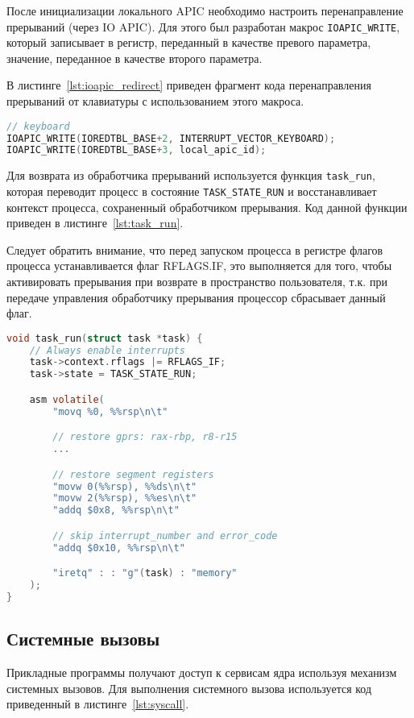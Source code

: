 После инициализации локального APIC необходимо настроить перенаправление прерываний (через IO APIC).
Для этого был разработан макрос \texttt{IOAPIC\_WRITE}, который записывает в регистр, переданный
в качестве превого параметра, значение, переданное в качестве второго параметра.

В листинге~\ref{lst:ioapic_redirect} приведен фрагмент кода перенаправления прерываний от клавиатуры
с использованием этого макроса.

\begin{lstlisting}[language=C,
caption={Настройка IOAPIC},
label={lst:ioapic_redirect}]
// keyboard
IOAPIC_WRITE(IOREDTBL_BASE+2, INTERRUPT_VECTOR_KEYBOARD);
IOAPIC_WRITE(IOREDTBL_BASE+3, local_apic_id);
\end{lstlisting}

Для возврата из обработчика прерываний используется функция \texttt{task\_run},
которая переводит процесс в состояние \texttt{TASK\_STATE\_RUN} и восстанавливает
контекст процесса, сохраненный обработчиком прерывания. Код данной функции
приведен в листинге~\ref{lst:task_run}.

Следует обратить внимание, что перед запуском процесса в регистре флагов процесса
устанавливается флаг RFLAGS.IF, это выполняется для того, чтобы активировать прерывания
при возврате в пространство пользователя, т.к. при передаче управления обработчику
прерывания процессор сбрасывает данный флаг.

\begin{lstlisting}[language=C,
caption={Запуск процесса},
label={lst:task_run}]
void task_run(struct task *task) {
	// Always enable interrupts
	task->context.rflags |= RFLAGS_IF;
	task->state = TASK_STATE_RUN;

	asm volatile(
		"movq %0, %%rsp\n\t"

		// restore gprs: rax-rbp, r8-r15
		...

		// restore segment registers
		"movw 0(%%rsp), %%ds\n\t"
		"movw 2(%%rsp), %%es\n\t"
		"addq $0x8, %%rsp\n\t"

		// skip interrupt_number and error_code
		"addq $0x10, %%rsp\n\t"

		"iretq" : : "g"(task) : "memory"
	);
}
\end{lstlisting}

\subsection{Системные вызовы}
Прикладные программы получают доступ к сервисам ядра используя механизм системных
вызовов. Для выполнения системного вызова используется код приведенный в
листинге~\ref{lst:syscall}.

